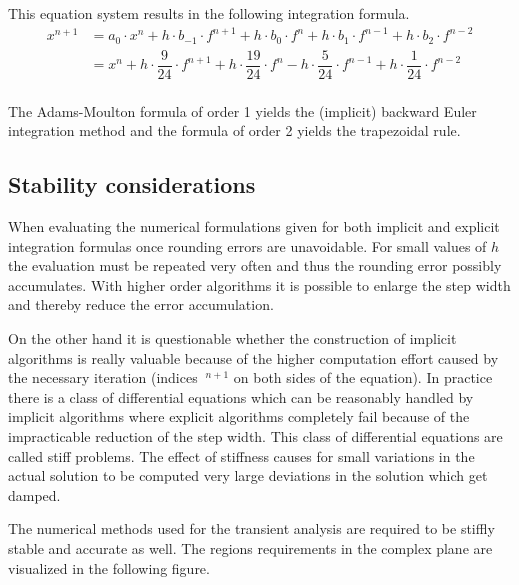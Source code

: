 This equation system results in the following integration formula.
\begin{equation}
\label{eq:MoultonInt}
\begin{split}
x^{n+1} &= a_0\cdot x^{n} + h\cdot b_{-1}\cdot f^{n+1} + h\cdot b_{0}\cdot f^{n} + h\cdot b_{1}\cdot f^{n-1} + h\cdot b_{2}\cdot f^{n-2}\\
&= x^{n} + h\cdot \dfrac{9}{24}\cdot f^{n+1} + h\cdot \dfrac{19}{24}\cdot f^{n} - h\cdot \dfrac{5}{24}\cdot f^{n-1} + h\cdot \dfrac{1}{24}\cdot f^{n-2}\\
\end{split}
\end{equation}

The Adams-Moulton formula of order 1 yields the (implicit) backward
Euler integration method and the formula of order 2 yields the
trapezoidal rule.

\subsection{Stability considerations}

When evaluating the numerical formulations given for both implicit and
explicit integration formulas once rounding errors are unavoidable.
For small values of $h$ the evaluation must be repeated very often and
thus the rounding error possibly accumulates.  With higher order
algorithms it is possible to enlarge the step width and thereby reduce
the error accumulation.

\addvspace{12pt}

On the other hand it is questionable whether the construction of
implicit algorithms is really valuable because of the higher
computation effort caused by the necessary iteration (indices
$~^{n+1}$ on both sides of the equation).  In practice there is a class
of differential equations which can be reasonably handled by implicit
algorithms where explicit algorithms completely fail because of the
impracticable reduction of the step width.  This class of differential
equations are called stiff problems.  The effect of stiffness causes
for small variations in the actual solution to be computed very large
deviations in the solution which get damped.

\addvspace{12pt}

The numerical methods used for the transient analysis are required to
be stiffly stable and accurate as well.  The regions requirements in
the complex plane are visualized in the following figure.

